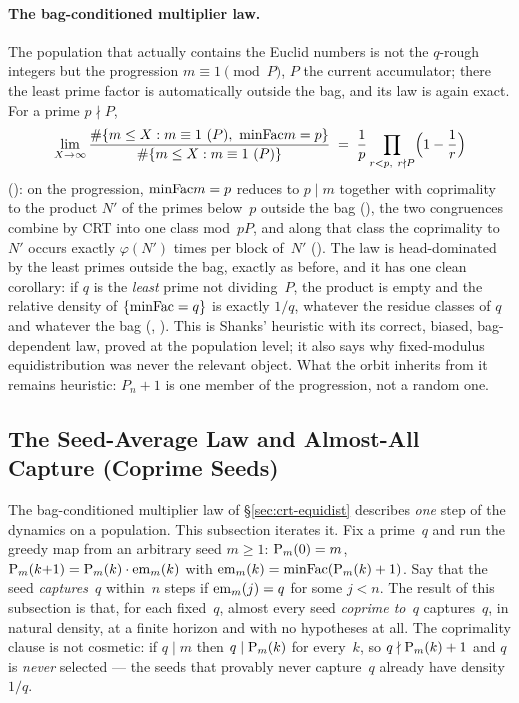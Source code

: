 \paragraph{The bag-conditioned multiplier law.}
The population that actually contains the Euclid numbers is not the
$q$-rough integers but the progression $m \equiv 1 \pmod{P}$, $P$ the
current accumulator; there the least prime factor is automatically outside
the bag, and its law is again exact.  For a prime $p \nmid P$,
\[
  \lim_{X\to\infty}
  \frac{\#\{m \le X : m \equiv 1\ (P),\ \mathrm{minFac} m = p\}}
       {\#\{m \le X : m \equiv 1\ (P)\}}
  \;=\;
  \frac1p \prod_{\substack{r<p,\ r\nmid P}} \Bigl(1-\frac1r\Bigr)
\]
():
on the progression, $\mathrm{minFac} m = p$ reduces to $p \mid m$ together with
coprimality to the product $N'$ of the primes below~$p$ outside the bag
(), the
two congruences combine by CRT into one class mod~$pP$, and along that
class the coprimality to $N'$ occurs exactly $\varphi(N')$ times per block
of~$N'$
().
The law is head-dominated by the least primes outside the bag, exactly as
before, and it has one clean corollary: if $q$ is the \emph{least} prime
not dividing~$P$, the product is empty and the relative density of
$\{\mathrm{minFac} = q\}$ is exactly $1/q$, whatever the residue classes of $q$
and whatever the bag
(,
 ).
This is Shanks' heuristic with its correct, biased, bag-dependent law,
proved at the population level; it also says why fixed-modulus
equidistribution was never the relevant object.  What the orbit inherits
from it remains heuristic: $P_n+1$ is one member of the progression, not
a random one.

\subsection{The Seed-Average Law and Almost-All Capture (Coprime Seeds)}
\label{sec:seed-average}
\keymark

The bag-conditioned multiplier law of \S\ref{sec:crt-equidist} describes
\emph{one} step
of the dynamics on a population.  This subsection iterates it.  Fix a
prime~$q$ and run the greedy map from an arbitrary seed $m \geq 1$:
$\mathrm{P}_{m}(0) = m$, $\mathrm{P}_{m}(k{+}1) = \mathrm{P}_{m}(k)\cdot\mathrm{em}_{m}(k)$ with
$\mathrm{em}_{m}(k) = \mathrm{minFac}(\mathrm{P}_{m}(k)+1)$.  Say that the seed
\emph{captures}~$q$ within~$n$ steps if $\mathrm{em}_{m}(j) = q$ for some $j < n$.
The result of this subsection is that, for each fixed~$q$, almost every
seed \emph{coprime to~$q$} captures~$q$, in natural density, at a finite
horizon and with no hypotheses at all.  The coprimality clause is not
cosmetic: if $q \mid m$ then $q \mid \mathrm{P}_{m}(k)$ for every~$k$, so
$q \nmid \mathrm{P}_{m}(k)+1$ and $q$ is \emph{never} selected --- the seeds that
provably never capture~$q$ already have density~$1/q$.

